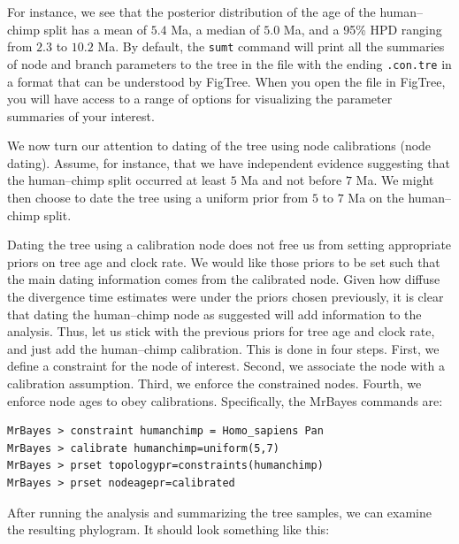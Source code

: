 \documentclass[12pt]{book}
\newcommand{\ttt}[1]{\texttt{#1}}
\begin{document}
For instance, we see that the posterior distribution of the age of the human--chimp split has a
mean of $5.4$ Ma, a median of $5.0$ Ma, and a 95\% HPD ranging from $2.3$ to $10.2$ Ma. By default, the
\ttt{sumt} command will print all the summaries of node and branch parameters to the tree in the
file with the ending \ttt{.con.tre} in a format that can be understood by FigTree. When you open
the file in FigTree, you will have access to a range of options for visualizing the parameter
summaries of your interest.

We now turn our attention to dating of the tree using node calibrations (node dating). Assume, for
instance, that we have independent evidence suggesting that the human--chimp split occurred at
least $5$ Ma and not before $7$ Ma. We might then choose to date the tree using a uniform prior
from $5$ to $7$ Ma on the human--chimp split.

Dating the tree using a calibration node does not free us from setting appropriate priors on tree
age and clock rate. We would like those priors to be set such that the main dating information
comes from the calibrated node. Given how diffuse the divergence time estimates were under the
priors chosen previously, it is clear that dating the human--chimp node as suggested will add
information to the analysis. Thus, let us stick with the previous priors for tree age and clock
rate, and just add the human--chimp calibration. This is done in four steps. First, we define a
constraint for the node of interest. Second, we associate the node with a calibration assumption.
Third, we enforce the constrained nodes. Fourth, we enforce node ages to obey calibrations.
Specifically, the MrBayes commands are:

\begin{singlespacing}
\begin{verbatim}
MrBayes > constraint humanchimp = Homo_sapiens Pan
MrBayes > calibrate humanchimp=uniform(5,7)
MrBayes > prset topologypr=constraints(humanchimp)
MrBayes > prset nodeagepr=calibrated
\end{verbatim}
\end{singlespacing}

After running the analysis and summarizing the tree samples, we can examine the resulting
phylogram. It should look something like this:
\end{document}
